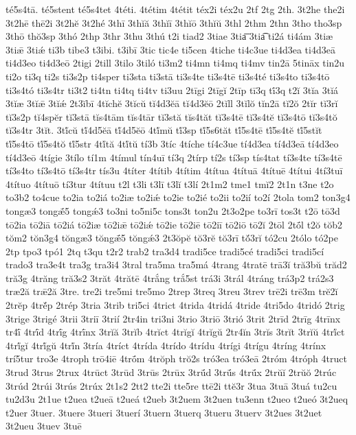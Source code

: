 {té5s4tā.
té5stent
té5s4tet
4téti.
4tétim
4tétit
téx2i
téx2u
2tf
2tg
2th.
3t2he
the2i
3t2hē
thē2i
3t2hĕ
3t2hé
3thī
3thĭă
3thĭī
3thĭō
3thĭŭ
3thl
2thm
2thn
3tho
tho3sp
3thō
thŏ3sp
3thó
2thp
3thr
3thu
3thú
t2i
tiad2
3tiae
3tia͞
3tia͡
ti2á
ti4ám
3tiæ
3tiǣ
3tiǽ
ti3b
tibe3
t3ibi.
t3ibī
3tic
tic4e
ti5cen
4tiche
ti4c3ue
ti4d3ea
ti4d3eā
ti4d3eo
ti4d3eō
2tigi
2till
3tilo
3tiló
ti3m2
ti4mn
ti4mq
ti4mv
tin2ā
5tināx
tin2u
ti2o
ti3q
ti2s
ti3s2p
ti4sper
ti3sta
ti3stā
ti3s4te
ti3s4tē
ti3s4té
ti3s4to
ti3s4tō
ti3s4tó
ti3s4tr
ti3t2
ti4tn
ti4tq
ti4tv
ti3uu
2tīgi
2tīgĭ
2tīp
tī3q
tī́3q
t2ĭ
3tĭa
3tĭá
3tĭæ
3tĭǣ
3tĭǽ
2t3ĭbī
4tĭchĕ
3tĭcŭ
tĭ4d3ĕā
tĭ4d3ĕō
2tĭll
3tĭlŏ
tĭn2ā
tĭ2ŏ
2tĭr
tĭ3rĭ
tĭ3s2p
tĭ4spĕr
tĭ3stā
tĭs4tām
tĭs4tār
tĭ3stă
tĭs4tăt
tĭ3s4tē
tĭ3s4tĕ
tĭ3s4tō
tĭ3s4tŏ
tĭ3s4tr
3tĭt.
3tĭ́cŭ
tĭ́4d5ĕā
tĭ́4d5ĕō
4tĭ́mŭ
tĭ́3sp
tĭ́5s6tăt
tĭ́5s4tē
tĭ́5s4tĕ
tĭ́5stĭt
tĭ́5s4tō
tĭ́5s4tŏ
tĭ́5str
4tĭ́tă
4tĭ́tŭ
tí3b
3tíc
4tíche
tí4c3ue
tí4d3ea
tí4d3eā
tí4d3eo
tí4d3eō
4tígie
3tílo
tí1m
4tímul
tín4uī
tí3q
2tírp
tí2s
tí3sp
tís4tat
tí3s4te
tí3s4tē
tí3s4to
tí3s4tō
tí3s4tr
tís3u
4títer
4títib
4títim
4títua
4títuā
4títuē
4títui
4tí3tuī
4títuo
4títuō
tí3tur
4títuu
t2l
t3li
t3lī
t3lĭ
t3lí
2t1m2
tme1
tmĭ2
2t1n
t3ne
t2o
to3b2
to4cue
to2ia
to2iá
to2iæ
to2iǽ
to2ie
to2ié
to2ii
to2ií
to2í
2tola
tom2
ton3g4
tongæ3
tongǣ́5
tongǽ3
to3ni
to5ni5c
tons3t
ton2u
2t3o2pe
to3rī
tos3t
t2ō
tō3d
tō2ia
tō2iā
tō2iá
tō2iæ
tō2iǣ
tō2iǽ
tō2ie
tō2iē
tō2iī
tō2iō
tō2ĭ
2tōl
2tṓl
t2ŏ
tŏb2
tŏm2
tŏn3g4
tŏngæ3
tŏngǣ́5
tŏngǽ3
2t3ŏpĕ
tŏ3rĕ
tŏ3rī
tŏ́3rĭ
tó2cu
2tólo
tó2pe
2tp
tpo3
tpó1
2tq
t3qu
t2r2
trab2
tra3d4
tradi5ce
tradi5cé
tradi5ci
tradi5cí
trado3
tra3e4t
tra3g
tra3i4
3tral
tra5ma
tra5má
4trang
4tratē
trā3ĭ
tră3bŭ
trăd2
tră3g
4trăng
tră3s2
3trăt
4trătē
4trắng
trắ5st
trá3i
3trál
4tráng
trá3p2
trá2s3
træ2ă
trǣ2ă
3tre.
tre2i
tre5mi
tre5mo
2trep
3treq
3treu
3trev
trē2i
trē3m
trĕ2ĭ
2trĕp
4trĕ́p
2trép
3tria
3trib
tri5ci
4trict
4trida
4tridá
4tride
4tri5do
4tridó
2trig
3trige
3trigé
3trii
3triī
3trií
2tr4in
tri3ni
3trio
3triō
3trió
3trit
2trīd
2trīg
4trīnx
tr4ī́
4trī́d
4trī́g
4trī́nx
3trĭă
3trĭb
4trĭct
4trĭgĭ
4trĭgŭ
2tr4ĭn
3trĭs
3trĭt
3trĭŭ
4trĭ́ct
4trĭ́gĭ
4trĭ́gŭ
4trĭ́n
3tría
4tríct
4trída
4trído
4trídu
4trígi
4trígu
4tríng
4trínx
trí5tur
tro3e
4troph
trō4iē
4trṓm
4trŏph
trŏ2s
tró3ea
tró3eā
2tróm
4tróph
4truct
3trud
3trus
2trux
4trūct
3trūd
3trūs
2trūx
3trū́d
3trū́s
4trū́x
2trŭĭ
2trŭŏ
2trúc
3trúd
2trúi
3trús
2trúx
2t1s2
2tt2
tte2i
tte5re
ttē2i
ttĕ3r
3tua
3tuā
3tuá
tu2cu
tu2d3u
2t1ue
t2uea
t2ueā
t2ueá
t2ueb
3t2uem
3t2uen
tu3enn
t2ueo
t2ueó
3t2ueq
t2uer
3tuer.
3tuere
3tueri
3tuerí
3tuern
3tuerq
3tueru
3tuerv
3t2ues
3t2uet
3t2ueu
3tuev
3tuē
}
